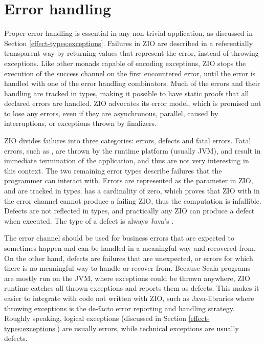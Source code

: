 \section{Error handling} \label{zio:error-handling}
Proper error handling is essential in any non-trivial application, as discussed in Section \ref{effect-types:exceptions}. Failures in ZIO are described in a referentially transparent way by returning values that represent the error, instead of throwing exceptions. Like other monads capable of encoding exceptions, ZIO stops the execution of the success channel on the first encountered error, until the error is handled with one of the error handling combinators. Much of the errors and their handling are tracked in types, making it possible to have static proofs that all declared errors are handled. ZIO advocates its error model, which is promised not to lose any errors, even if they are asynchronous, parallel, caused by interruptions, or exceptions thrown by finalizers.

ZIO divides failures into three categories: errors, defects and fatal errors. Fatal errors, such as , are thrown by the runtime platform (usually JVM), and result in immediate termination of the application, and thus are not very interesting in this context.
The two remaining error types describe failures that the programmer can interact with. Errors are represented as the  parameter in ZIO, and are tracked in types.  has a cardinality of zero, which proves that ZIO with  in the error channel cannot produce a failing ZIO, thus the computation is infallible. Defects are not reflected in types, and practically any ZIO can produce a defect when executed. The type of a defect is always Java's .

The error channel should be used for business errors that are expected to sometimes happen and can be handled in a meaningful way and recovered from. On the other hand, defects are failures that are unexpected, or errors for which there is no meaningful way to handle or recover from. Because Scala programs are mostly run on the JVM, where exceptions could be thrown anywhere, ZIO runtime catches all thrown exceptions and reports them as defects. This makes it easier to integrate with code not written with ZIO, such as Java-libraries where throwing exceptions is the de-facto error reporting and handling strategy. Roughly speaking, logical exceptions (discussed in Section \ref{effect-types:exceptions}) are usually errors, while technical exceptions are usually defects.

